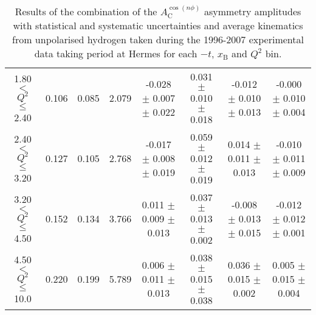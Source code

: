 \begin{table}[width=15cm]
\begin{center}
{\begin{tabular}{|c|c|c|c|c|c|c|c|}
1.80 $<$ $Q^{2}$ $\leqslant$ 2.40 &  0.106 & 0.085 &  2.079 &  -0.028  $\pm$  0.007  $\pm$   0.022 &
 0.031  $\pm$  0.010  $\pm$   0.018 & -0.012 $\pm$   0.010  $\pm$  0.013 & -0.000  $\pm$   0.010  $\pm$  0.004\\
2.40 $<$ $Q^{2}$ $\leqslant$ 3.20 &  0.127 &  0.105 & 2.768 &  -0.017 $\pm$   0.008  $\pm$   0.019 &  
0.059  $\pm$  0.012  $\pm$   0.019 & 0.014  $\pm$  0.011  $\pm$  0.013 & -0.010  $\pm$  0.011  $\pm$  0.009\\
3.20 $<$ $Q^{2}$ $\leqslant$ 4.50 &   0.152 & 0.134 &  3.766 &  0.011  $\pm$  0.009   $\pm$  0.013 & 
0.037 $\pm$   0.013  $\pm$   0.002 & -0.008  $\pm$  0.013 $\pm$ 0.015 & -0.012   $\pm$  0.012  $\pm$  0.001\\
4.50 $<$ $Q^{2}$ $\leqslant$ 10.0 & 0.220  & 0.199 & 5.789  &  0.006  $\pm$  0.011  $\pm$   0.013 & 
0.038  $\pm$  0.015  $\pm$  0.038 & 0.036 $\pm$   0.015  $\pm$  0.002 & 0.005   $\pm$  0.015   $\pm$   0.004\\
\hline
  \end{tabular}
}
 \end{center}
\caption{Results of the combination of the $A_{\textrm{C}}^{\cos(n\phi)}$ asymmetry amplitudes with statistical and systematic uncertainties and average kinematics from unpolarised hydrogen taken during
the 1996-2007 experimental data taking period at H{\sc ermes} for each $-t$, $x_{\textrm{B}}$ and $Q^{2}$ bin.}
\end{table}

